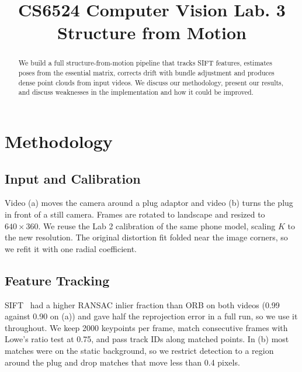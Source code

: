 \documentclass[conference]{assets/latex/IEEEtran}
\begin{document}
\title{CS6524 Computer Vision Lab. 3\\ Structure from Motion}

\author{
\and
{}
\and
{}
}

\maketitle

\begin{abstract}
We build a full structure-from-motion pipeline that tracks SIFT features, estimates poses from the essential matrix, corrects drift with bundle adjustment and produces dense point clouds from input videos. We discuss our methodology, present our results, and discuss weaknesses in the implementation and how it could be improved.
\end{abstract}

\section{Methodology}\label{sec:methodology}

\subsection{Input and Calibration}
Video (a) moves the camera around a plug adaptor and video (b) turns the
plug in front of a still camera. Frames are rotated to landscape and
resized to $640\times360$. We reuse the Lab 2 calibration of the same
phone model, scaling $K$ to the new resolution. The original distortion
fit folded near the image corners, so we refit it with one radial
coefficient.

\subsection{Feature Tracking}
SIFT~\cite{lowe2004sift} had a higher RANSAC inlier fraction than ORB on
both videos (0.99 against 0.90 on (a)) and gave half the reprojection
error in a full run, so we use it throughout. We keep 2000 keypoints per
frame, match consecutive frames with Lowe's ratio test at 0.75, and pass
track IDs along matched points. In (b) most matches were on the static
background, so we restrict detection to a region around the plug and
drop matches that move less than 0.4 pixels.
\end{document}
